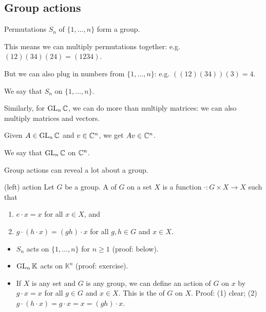 \documentclass[12pt,letterpaper]{report}
\begin{document}
\subsection{Group actions}

\begin{ex}
  Permutations $S_n$ of $\{1, \ldots, n\}$ form a group.

  This means we can multiply permutations together: e.g. $(12)(34)(24) = (1234)$.

  But we can also plug in numbers from $\{1, \ldots, n\}$: e.g. $((12)(34))(3) = 4$.

  We say that $S_n$  on $\{1, \ldots, n\}$.
\end{ex}

\begin{ex}
  Similarly, for $\operatorname{GL}_n\mathbb{C}$, we can do more than multiply matrices: we can also multiply
  matrices and vectors.

  Given $A \in \operatorname{GL}_n\mathbb{C}$ and $v \in \mathbb{C}^n$, we get $Av \in \mathbb{C}^n$.

  We say that $\operatorname{GL}_n\mathbb{C}$  on $\mathbb{C}^n$.
\end{ex}

Group actions can reveal a lot about a group.

\begin{defn}{(left) action}{}
  Let $G$ be a group.
  A  of $G$ on a set $X$ is a function $\cdot \colon G \times X \to X$ such
  that
  \begin{enumerate}
    \item $e \cdot x = x$ for all $x \in X$, and
    \item $g \cdot (h \cdot x) = (gh) \cdot x$ for all $g, h \in G$ and $x \in X$.
  \end{enumerate}
\end{defn}

\begin{ex}
  \begin{itemize}
    \item $S_n$ acts on $\{1, \ldots, n\}$ for $n \geq 1$ (proof: below).
    \item $\operatorname{GL}_n\mathbb{K}$ acts on $\mathbb{K}^n$ (proof: exercise).
    \item If $X$ is any set and $G$ is any group, we can define an action of $G$ on $x$ by
      $g \cdot x = x$ for all $g \in G$ and $x \in X$.
      This is the  of $G$ on $X$.
      Proof: (1) clear; (2) $g \cdot (h \cdot x) = g \cdot x = x = (gh) \cdot x$.
  \end{itemize}
\end{ex}
\end{document}
